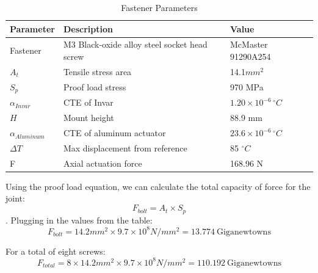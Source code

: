 \documentclass[12pt, letterpaper]{report}%
\newcommand{\degC}{^{\circ}C}    %
\begin{document}
        \begin{table}[H]
                \centering
                \caption{Fastener Parameters}
                \label{tab:fastener_parameters}
                \begin{tabularx}{\textwidth}{l X l}
                    \toprule
                    \textbf{Parameter} & \textbf{Description} & \textbf{Value} \\
                    \midrule
                    Fastener &
                    M3 Black-oxide alloy steel socket head screw &
                    McMaster 91290A254
                        \\\addlinespace
                    $A_t$ &
                    Tensile stress area &
                    14.1$mm^2$
                    \\\addlinespace
                    $S_p$ &
                    Proof load stress &
                    970 MPa
                    \\\addlinespace
                    $\alpha_{Invar}$ &
                    CTE of Invar &
                    $1.20 \times 10^{-6} \, \degC$
                    \\\addlinespace
                    $H$ &
                    Mount height &
                    88.9 mm
                    \\\addlinespace
                    $\alpha_{Aluminum}$ &
                    CTE of aluminum actuator &
                    $23.6 \times 10^{-6} \, \degC$
                        \\\addlinespace
                    $\Delta{T}$ &
                    Max displacement from reference &
                    85 $\degC$
                    \\\addlinespace
                    F &
                    Axial actuation force &
                    168.96 N
                    \\\bottomrule
                \end{tabularx}
            \end{table}

        Using the proof load equation, we can calculate the total capacity of force for the joint:
        \[ F_{bolt} = A_t \times S_p \]. Plugging in the values from the table:
        \[ F_{bolt} = 14.2 mm^2 \times 9.7 \times 10^8 {N/mm^2} = 13.774 \ \text{Giganewtowns} \]

        For a total of eight screws:
         \[ F_{total} = 8 \times 14.2 mm^2 \times 9.7 \times 10^8 {N/mm^2} = 110.192 \ \text{Giganewtowns} \]
\end{document}
